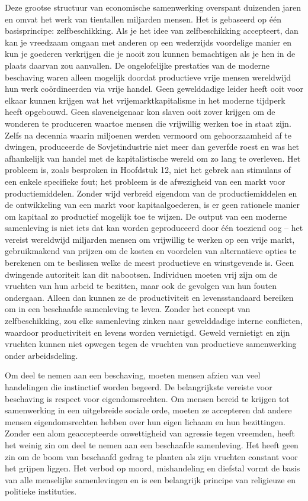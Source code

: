 \documentclass[
  a5paper,
  smalldemyvopaper,11pt,twoside,onecolumn,openright,extrafontsizes,
hidelinks]{memoir}
\begin{document}
Deze grootse structuur van economische samenwerking overspant duizenden
jaren en omvat het werk van tientallen miljarden mensen. Het is
gebaseerd op één basisprincipe: zelfbeschikking. Als je het idee van
zelfbeschikking accepteert, dan kan je vreedzaam omgaan met anderen op
een wederzijds voordelige manier en kun je goederen verkrijgen die je
nooit zou kunnen bemachtigen als je hen in de plaats daarvan zou
aanvallen. De ongelofelijke prestaties van de moderne beschaving waren
alleen mogelijk doordat productieve vrije mensen wereldwijd hun werk
coördineerden via vrije handel. Geen gewelddadige leider heeft ooit voor
elkaar kunnen krijgen wat het vrijemarktkapitalisme in het moderne
tijdperk heeft opgebouwd. Geen slaveneigenaar kon slaven ooit zover
krijgen om de wonderen te produceren waartoe mensen die vrijwillig
werken toe in staat zijn. Zelfs na decennia waarin miljoenen werden
vermoord om gehoorzaamheid af te dwingen, produceerde de Sovjetindustrie
niet meer dan geverfde roest en was het afhankelijk van handel met de
kapitalistische wereld om zo lang te overleven. Het probleem is, zoals
besproken in Hoofdstuk 12, niet het gebrek aan stimulans of een enkele
specifieke fout; het probleem is de afwezigheid van een markt voor
productiemiddelen. Zonder wijd verbreid eigendom van de
productiemiddelen en de ontwikkeling van een markt voor
kapitaalgoederen, is er geen rationele manier om kapitaal zo productief
mogelijk toe te wijzen. De output van een moderne samenleving is niet
iets dat kan worden geproduceerd door één toeziend oog -- het vereist
wereldwijd miljarden mensen om vrijwillig te werken op een vrije markt,
gebruikmakend van prijzen om de kosten en voordelen van alternatieve
opties te berekenen om te beslissen welke de meest productieve en
winstgevende is. Geen dwingende autoriteit kan dit nabootsen. Individuen
moeten vrij zijn om de vruchten van hun arbeid te bezitten, maar ook de
gevolgen van hun fouten ondergaan. Alleen dan kunnen ze de
productiviteit en levensstandaard bereiken om in een beschaafde
samenleving te leven. Zonder het concept van zelfbeschikking, zou elke
samenleving zinken naar gewelddadige interne conflicten, waardoor
productiviteit en levens worden vernietigd. Geweld vernietigt en zijn
vruchten kunnen niet opwegen tegen de vruchten van productieve
samenwerking onder arbeidsdeling.

Om deel te nemen aan een beschaving, moeten mensen afzien van veel
handelingen die instinctief worden begeerd. De belangrijkste vereiste
voor beschaving is respect voor eigendomsrechten. Om mensen bereid te
krijgen tot samenwerking in een uitgebreide sociale orde, moeten ze
accepteren dat andere mensen eigendomsrechten hebben over hun eigen
lichaam en hun bezittingen. Zonder een alom geaccepteerde onwettigheid
van agressie tegen vreemden, heeft het weinig zin om deel te nemen aan
een beschaafde samenleving. Het heeft geen zin om de boom van beschaafd
gedrag te planten als zijn vruchten constant voor het grijpen liggen.
Het verbod op moord, mishandeling en diefstal vormt de basis van alle
menselijke samenlevingen en is een belangrijk principe van religieuze en
politieke instituties.
\end{document}
